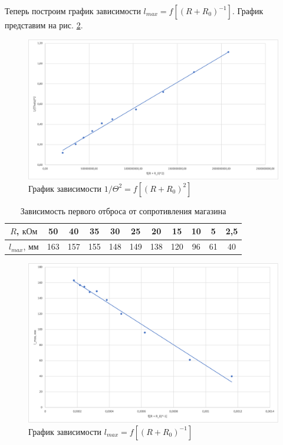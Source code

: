 \documentclass[a4paper, 12pt]{article}
\begin{document}
\begin{enumerate}
        Теперь построим график зависимости $l_{max} = f[(R + R_0)^{-1}]$. График представим на рис. \ref{pic5}.
        
        \newpage
        
        \begin{figure}[ht]
            \centering
            \includegraphics[width=0.9\linewidth]{images/graph2.png}
            \caption{График зависимости $1/\Theta^2 = f[(R + R_0)^2]$}
            \label{pic4}
        \end{figure}
        
        \begin{table}[ht]
            \centering
            \begin{tabular}{|c||c|c|c|c|c|c|c|c|c|c|}
                \hline
                $R$, $\text{кОм}$ & 50 & 40 & 35 & 30 & 25 & 20 & 15 & 10 & 5 & 2,5 \\
                \hline
                $l_{max}$, $\text{мм}$ & 163 & 157 & 155 & 148 & 149 & 138 & 120 & 96 & 61 & 40 \\
                \hline
            \end{tabular}
            \caption{Зависимость первого отброса от сопротивления магазина}
            \label{table3}
        \end{table}
        
        \begin{figure}[h!]
            \centering
            \includegraphics[width=0.9\linewidth]{images/graph3.png}
            \caption{График зависимости $l_{max} = f[(R + R_0)^{-1}]$}
            \label{pic5}
        \end{figure}
        

\end{enumerate}
\end{document}
